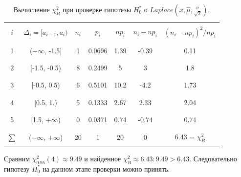 \documentclass[../body.tex]{subfiles}
\begin{document}
		\begin{table}[H]
			\centering
			\begin{tabular}{| c | c | c | c | c | c | c |}
				\hline \hline
				&  &  &  &  &  & \\
				$i$   & $\Delta_i = [a_{i-1}, a_i)$   &   $n_i$ &   $p_i$ &   $np_i$ &   $n_i - np_i$ &   $(n_i - np_i)^2/np_i$ \\
				&  &  &  &  &  & \\
				\hline
				&  &  &  &  &  & \\
				1     & ($-\infty$, -1.5]           &       1 &  0.0696 &     1.39 &          -0.39 &                    0.11 \\
				&  &  &  &  &  & \\\hline &  &  &  &  &  & \\
				2     & [-1.5, -0.5)                  &       8 &  0.2499 &     5    &           3    &                    1.8  \\
				&  &  &  &  &  & \\\hline &  &  &  &  &  & \\
				3     & [-0.5, 0.5)                   &       6 &  0.5101 &    10.2  &          -4.2  &                    1.73 \\
				&  &  &  &  &  & \\\hline &  &  &  &  &  & \\
				4     & [0.5, 1.)                     &       5 &  0.1333 &     2.67 &           2.33 &                    2.04 \\
				&  &  &  &  &  & \\\hline &  &  &  &  &  & \\
				5     & [1.5, $+\infty$)            &       0 &  0.0371 &     0.74 &          -0.74 &                    0.74 \\
				&  &  &  &  &  & \\\hline &  &  &  &  &  & \\
				$\sum$  & ($-\infty$, $+\infty$)                          &      20 &  1      &    20    &           0    &                    6.43 = $\chi_B^2$ \\
				&  &  &  &  &  & \\\hline \hline
			\end{tabular}
			\caption{Вычисление $\chi_B^2$ при проверке гипотезы $H_0^*$ о $Laplace(x, \hat{\mu},\frac{\hat{\sigma}}{\sqrt2} )$.}
			\label{chi2_laplace}
		\end{table}
		Сравним $\chi_{0.95}^2(4) \approx 9.49$ и найденное  $\chi_B^2 \approx 6.43: 9.49 > 6.43.$ Следовательно гипотезу $H_0^*$ на данном этапе проверки можно принять.\\
		
\end{document}
